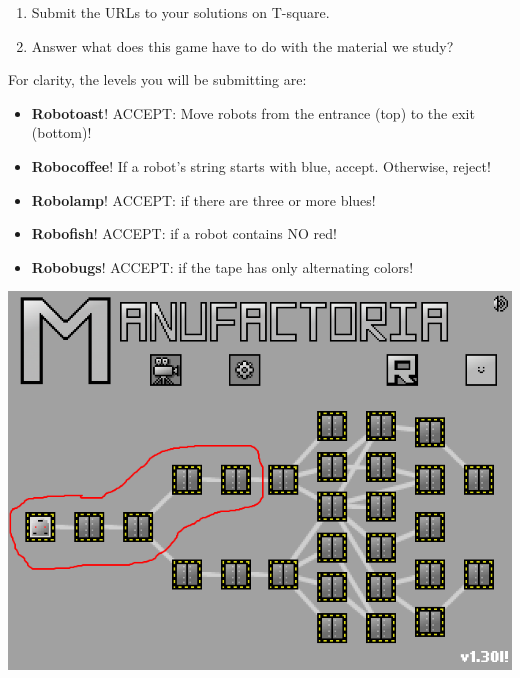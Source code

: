 \documentclass[10pt, legalpaper]{exam}
\begin{document}
\begin{questions}
\begin{enumerate}
\item Submit the URLs to your solutions on T-square.

\item Answer what does this game have to do with the material we study?\end{enumerate}
For clarity, the levels you will be submitting are:
\begin{itemize}
\item \textbf{Robotoast}! ACCEPT: Move robots from the entrance (top) to the exit (bottom)!
\item \textbf{Robocoffee}! If a robot's string starts with blue, accept. Otherwise, reject!
\item \textbf{Robolamp}! ACCEPT: if there are three or more blues!
\item \textbf{Robofish}! ACCEPT: if a robot contains NO red!
\item \textbf{Robobugs}! ACCEPT: if the tape has only alternating colors!
\end{itemize}
\includegraphics[scale=0.7]{manufactoria.png}


\end{questions}
\end{document}
